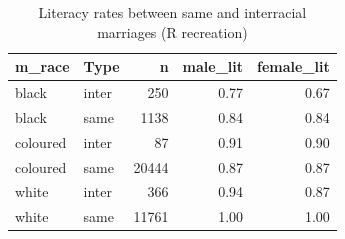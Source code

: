 \begin{table}

\caption{Literacy rates between same and interracial marriages (R recreation)}
\centering
\begin{tabular}[t]{llrrr}
\toprule
m\_race & Type & n & male\_lit & female\_lit\\
\midrule
black & inter & 250 & 0.77 & 0.67\\
black & same & 1138 & 0.84 & 0.84\\
coloured & inter & 87 & 0.91 & 0.90\\
coloured & same & 20444 & 0.87 & 0.87\\
white & inter & 366 & 0.94 & 0.87\\
\addlinespace
white & same & 11761 & 1.00 & 1.00\\
\bottomrule
\end{tabular}
\end{table}
